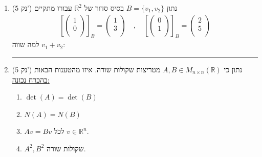 \documentclass[12pt, a4paper]{article}
\newcommand{\ntn}{n\times n}
\newcommand{\rr}{\mathbb{R}}
\newcommand{\points}[1]{(#1 נק') }
\begin{document}
\begin{enumerate}
\item\points{5}
נתון 
$B=\{v_1,v_2\}$
בסיס סדור של
$\rr^2$
עבורו מתקיים
\begin{align*}
\left[\begin{pmatrix}
1\\0\\
\end{pmatrix}\right]_B=
\begin{pmatrix}
1\\3 \\
\end{pmatrix}\quad,\quad
\left[\begin{pmatrix}
0\\1\\
\end{pmatrix}\right]_B=
\begin{pmatrix}
2\\5 \\
\end{pmatrix}
\end{align*}
למה שווה
$v_1+v_2$:
\begin{enumerate}
\end{enumerate}

\noindent\rule{16cm}{0.4pt}

\item\points{5}
נתון כי
$A,B\in M_{\ntn}(\rr)$
מטריצות שקולות שורה.
איזו מהטענות הבאות 
\underline{ בהכרח נכונה:}
\begin{enumerate}
\item
$\det(A)=\det(B)$
\item
$N(A)=N(B)$
\item
$Av=Bv$
לכל
$v\in\rr^n$.
\item
$A^2,B^2$
שקולות שורה.
\end{enumerate}




\end{enumerate}
\end{document}
